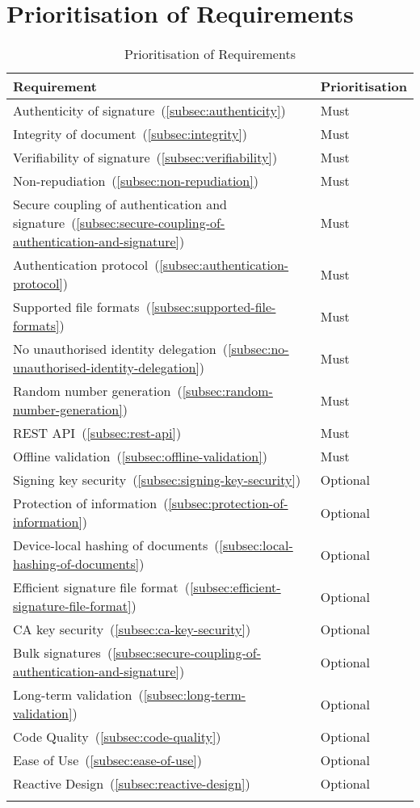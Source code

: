 \section{Prioritisation of Requirements}
\label{sec:prioritisation}
\begin{longtable}{p{12cm}|p{2.5cm}}
    \textbf{Requirement} & \textbf{Prioritisation}\\
    \hline
    Authenticity of signature~(\ref{subsec:authenticity}) & Must\\
    Integrity of document~(\ref{subsec:integrity}) & Must\\
    Verifiability of signature~(\ref{subsec:verifiability}) & Must\\
    Non-repudiation~(\ref{subsec:non-repudiation}) & Must\\
    Secure coupling of authentication and signature~(\ref{subsec:secure-coupling-of-authentication-and-signature}) & Must\\
    Authentication protocol~(\ref{subsec:authentication-protocol}) & Must\\
    Supported file formats~(\ref{subsec:supported-file-formats}) & Must\\
    No unauthorised identity delegation~(\ref{subsec:no-unauthorised-identity-delegation}) & Must\\
    Random number generation~(\ref{subsec:random-number-generation}) & Must\\
    \gls{REST} \gls{API}~(\ref{subsec:rest-api}) & Must\\
    Offline validation~(\ref{subsec:offline-validation}) & Must\\
    Signing key security~(\ref{subsec:signing-key-security}) & Optional\\
    Protection of information~(\ref{subsec:protection-of-information}) & Optional\\
    Device-local hashing of documents~(\ref{subsec:local-hashing-of-documents}) & Optional\\
    Efficient signature file format~(\ref{subsec:efficient-signature-file-format}) & Optional\\
    \gls{CA} key security~(\ref{subsec:ca-key-security}) & Optional\\
    Bulk signatures~(\ref{subsec:secure-coupling-of-authentication-and-signature}) & Optional\\
    Long-term validation~(\ref{subsec:long-term-validation}) & Optional\\
    Code Quality~(\ref{subsec:code-quality}) & Optional\\
    Ease of Use~(\ref{subsec:ease-of-use}) & Optional\\
    Reactive Design~(\ref{subsec:reactive-design}) & Optional\\
    \caption{Prioritisation of Requirements}
\end{longtable}
